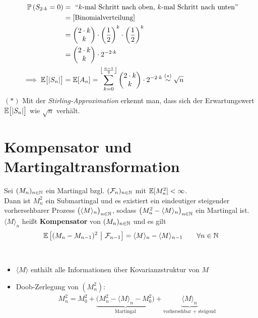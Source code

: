 \begin{beisp}
\begin{align*}
\mathbb{P}\left(S_{2\cdot k}=0\right)&=\text{ ``$k$-mal Schritt nach oben, $k$-mal Schritt nach unten''}\\
&=[\text{Binomialverteilung]}\\
&=\begin{pmatrix}
2\cdot k\\ k
\end{pmatrix}\cdot\left(\frac{1}{2}\right)^k\cdot\left(\frac{1}{2}\right)^k\\
&=\begin{pmatrix}
2\cdot k \\ k
\end{pmatrix}\cdot 2^{-2\cdot k}\\
\implies
\mathbb{E}\big[|S_n|\big]&=\mathbb{E}[A_n]=\sum\limits_{k=0}^{\left\lfloor\frac{n-1}{2}\right\rfloor}\begin{pmatrix}
2\cdot k\\ k
\end{pmatrix}\cdot 2^{-2\cdot k}\stackrel{(\ast)}{\sim}\sqrt{n}
\end{align*}
$(\ast)$ Mit der \textit{Stirling-Approximation} erkennt man, dass sich der Erwartungswert $\mathbb{E}\big[|S_n|\big]$ wie $\sqrt{n}$ verhält.
\end{beisp}

\section{Kompensator und Martingaltransformation} %
\setcounter{satz}{3}
\begin{lemma}\label{lemma2.4}
Sei $(M_n)_{n\in\mathbb{N}}$ ein Martingal bzgl. $(\mathcal{F}_n)_{n\in\mathbb{N}}$ mit $\mathbb{E}[M_n^2]<\infty$.\\
Dann ist $M_n^2$ ein Submartingal und es existiert ein eindeutiger steigender vorhersehbarer Prozess $\big(\langle M\rangle_n\big)_{n\in\mathbb{N}}$, sodass $\big(M_n^2-\langle M\rangle_n\big)_{n\in\mathbb{N}}$ ein Martingal ist. $\langle M\rangle_n$ heißt \textbf{Kompensator} von $(M_n)_{n\in\mathbb{N}}$ und es gilt
\begin{align}\label{eqLemma2.4}
\mathbb{E}\left[(M_n-M_{n-1})^2~\big|~\mathcal{F}_{n-1}\right]=\langle M\rangle_n-\langle M\rangle_{n-1}\qquad\forall n\in\mathbb{N}
\end{align}
\end{lemma}

\begin{bemerkung}\ %
\begin{itemize}
\item $\langle M\rangle$ enthält alle Informationen über Kovarianzstruktur von $M$
\item Doob-Zerlegung von $(M_n^2)$:
\begin{align*}
M_n^2=M_0^2+\underbrace{\big(M_n^2-\langle M\rangle_n-M_0^2\big)}_{\text{Martingal}}+\underbrace{\langle M\rangle_n}_{\text{vorhersehbar + steigend}}
\end{align*}
\end{itemize}
\end{bemerkung}

